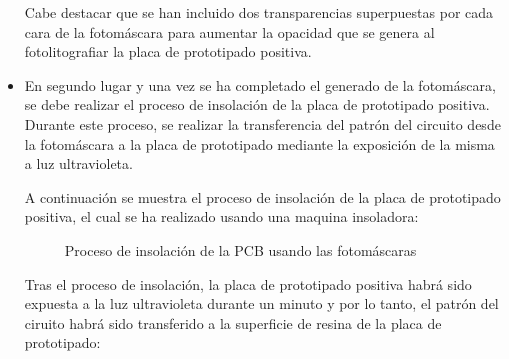 \begin{itemize}
    Cabe destacar que se han incluido dos transparencias superpuestas por cada cara de la fotomáscara para aumentar la opacidad que se genera al fotolitografiar la placa de prototipado positiva.
    
    \item En segundo lugar y una vez se ha completado el generado de la fotomáscara, se debe realizar el proceso de insolación de la placa de prototipado positiva. Durante este proceso, se realizar la transferencia del patrón del circuito desde la fotomáscara a la placa de prototipado mediante la exposición de la misma a luz ultravioleta.
    
    A continuación se muestra el proceso de insolación de la placa de prototipado positiva, el cual se ha realizado usando una maquina insoladora:
    
    \begin{figure}[H]
    \centering
    \caption{Proceso de insolación de la PCB usando las fotomáscaras} \label{fig:lego}
    \end{figure}
    
    Tras el proceso de insolación, la placa de prototipado positiva habrá sido expuesta a la luz ultravioleta durante un minuto y por lo tanto, el patrón del ciruito habrá sido transferido a la superficie de resina de la placa de prototipado:
    

\end{itemize}
